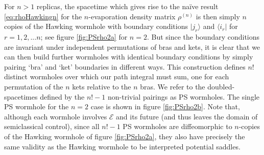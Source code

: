 \documentclass[letterpaper,12pt]{article}
\newcommand*{\evap}{\mathscr{E}} %
\begin{document}
For $n>1$ replicas, the spacetime which gives rise to the na\"ive result \eqref{eq:rhoHawkingn} for the $n$-evaporation density matrix $\rho^{(n)}$ is then simply $n$ copies of the Hawking wormhole with boundary conditions $|j_r\rangle$ and $\langle i_r|$ for $r=1,2,...n$; see figure \ref{fig:PSrho2a} for $n=2$. But since the boundary conditions are invariant under independent permutations of bras and kets, it is clear that we can then build further wormholes with identical boundary conditions by simply pairing `bra' and `ket' boundaries in different ways. This construction defines $n!$ distinct wormholes over which our path integral must sum, one for each permutation of the $n$ kets relative to the $n$ bras.   We refer to the doubled-spacetimes defined by the $n!-1$ non-trivial pairings as PS wormholes.  The single PS wormhole for the $n=2$ case is shown in figure \ref{fig:PSrho2b}.   Note that, although each wormhole involves $\evap$ and its future (and thus leaves the domain of semiclassical control), since all $n!-1$ PS wormholes are diffeomorphic to $n$-copies of the Hawking wormhole of figure \ref{fig:PSrho2a}, they also have precisely the same validity as the Hawking wormhole to be interpreted potential saddles.
%
\end{document}
